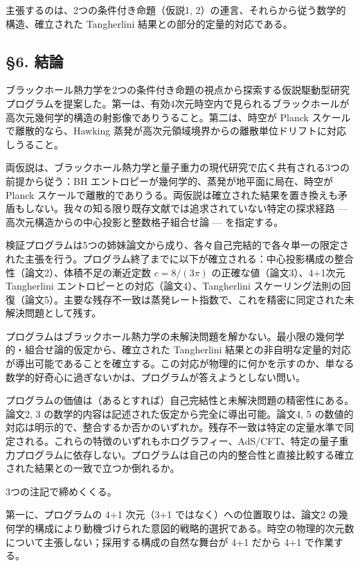\documentclass[a4paper,11pt]{ltjsarticle}
\theoremstyle{definition}
\begin{document}
主張するのは、2つの条件付き命題（仮説1,
2）の連言、それらから従う数学的構造、確立された Tangherlini
結果との部分的定量的対応である。

\subsection{§6. 結論}\label{ux7d50ux8ad6}

ブラックホール熱力学を2つの条件付き命題の視点から探索する仮説駆動型研究プログラムを提案した。第一は、有効4次元時空内で見られるブラックホールが高次元幾何学的構造の射影像でありうること。第二は、時空が
Planck スケールで離散的なら、Hawking
蒸発が高次元領域境界からの離散単位ドリフトに対応しうること。

両仮説は、ブラックホール熱力学と量子重力の現代研究で広く共有される3つの前提から従う：BH
エントロピーが幾何学的、蒸発が地平面に局在、時空が Planck
スケールで離散的でありうる。両仮説は確立された結果を置き換えも矛盾もしない。我々の知る限り既存文献では追求されていない特定の探求経路
--- 高次元構造からの中心投影と整数格子組合せ論 --- を指定する。

検証プログラムは5つの姉妹論文から成り、各々自己完結的で各々単一の限定された主張を行う。プログラム終了までに以下が確立される：中心投影構成の整合性（論文2）、体積不足の漸近定数
\(c = 8/(3\pi)\) の正確な値（論文3）、4+1次元 Tangherlini
エントロピーとの対応（論文4）、Tangherlini
スケーリング法則の回復（論文5）。主要な残存不一致は蒸発レート指数で、これを精密に同定された未解決問題として残す。

プログラムはブラックホール熱力学の未解決問題を解かない。最小限の幾何学的・組合せ論的仮定から、確立された
Tangherlini
結果との非自明な定量的対応が導出可能であることを確立する。この対応が物理的に何かを示すのか、単なる数学的好奇心に過ぎないかは、プログラムが答えようとしない問い。

プログラムの価値は（あるとすれば）自己完結性と未解決問題の精密性にある。論文2,
3 の数学的内容は記述された仮定から完全に導出可能。論文4, 5
の数値的対応は明示的で、整合するか否かのいずれか。残存不一致は特定の定量水準で同定される。これらの特徴のいずれもホログラフィー、AdS/CFT、特定の量子重力プログラムに依存しない。プログラムは自己の内的整合性と直接比較する確立された結果との一致で立つか倒れるか。

3つの注記で締めくくる。

第一に、プログラムの 4+1 次元（3+1 ではなく）への位置取りは、論文2
の幾何学的構成により動機づけられた意図的戦略的選択である。時空の物理的次元数について主張しない；採用する構成の自然な舞台が
4+1 だから 4+1 で作業する。
\end{document}
